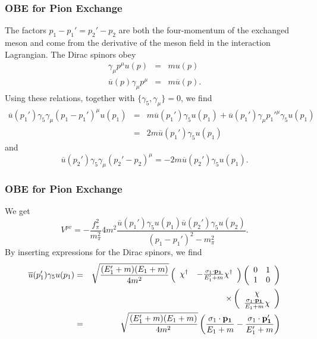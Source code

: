 \documentclass[compress]{beamer}
\begin{document}
\frame
{
\frametitle{OBE for Pion Exchange}
The factors $p_{1}-p_{1}'=p_{2}'-p_{2}$ are both the four-momentum of the 
exchanged meson and come from the derivative of the meson field in 
the interaction Lagrangian. 
The Dirac spinors obey 
\begin{eqnarray}
\gamma_{\mu}p^{\mu}u(p)&=&mu(p) \nonumber \\
\overline{u}(p)\gamma_{\mu}p^{\mu}&=&m\overline{u}(p). \nonumber
\end{eqnarray} 
Using these relations, together with $\{\gamma_{5},\gamma_{\mu}\}=0$, 
we find 
\begin{eqnarray}
\overline{u}(p_{1}')\gamma_{5}\gamma_{\mu}(p_{1}-p_{1}')^{\mu}u(p_{1})
&=&m\overline{u}(p_{1}')\gamma_{5}u(p_{1})+\overline{u}(p_{1}')\gamma_{\mu}
p_{1}'^{\mu}\gamma_{5}u(p_{1}) \nonumber \\
 &=&2m\overline{u}(p_{1}')\gamma_{5}u(p_{1}) \nonumber
\end{eqnarray}
and 
\[
\overline{u}(p_{2}')\gamma_{5}\gamma_{\mu}(p_{2}'-p_{2})^{\mu}=
-2m\overline{u}(p_{2}')\gamma_{5}u(p_{1}).
\]

}


\frame
{
\frametitle{OBE for Pion Exchange}
\begin{small}
We get 
\[
V^{pv}=-\frac{f_{\pi}^{2}}{m_{\pi}^{2}}4m^{2}\frac{\overline{u}(p_{1}')
\gamma_{5}u(p_{1})\overline{u}(p_{2}')\gamma_{5}u(p_{2})}{(p_{1}-p_{1}')
^{2}-m_{\pi}^{2}}.
\]
By inserting expressions for the Dirac spinors, we find
\begin{eqnarray*}
\overline{u}(p_{1}')\gamma_{5}u(p_{1})&=&\sqrt{\frac{(E_{1}'+m)(E_{1}+m)}
{4m^{2}}}\left(\begin{array}{cc}\chi^{\dagger}&-\frac{\sigma_{1}\cdot{
\bf p_{1}}}{E_{1}'
+m}\chi^{\dagger}\end{array}\right)\left(\begin{array}{cc}0&1\\1&0\end{array}
\right)\nonumber \\
 &&\times \left(\begin{array}{c}\chi\\ \frac{\sigma_{1}\cdot{\bf p_{1}}}{E_{1}+m}\chi
\end{array}\right) 
\nonumber \\
 &=&\sqrt{\frac{(E_{1}'+m)(E_{1}+m)}{4m^{2}}}\left(\frac{\sigma_{1}\cdot
{\bf p_{1}}}{E_{1}+m}-\frac{\sigma_{1}\cdot{\bf p_{1}'}}{E_{1}'+m}\right) 
\nonumber 
\end{eqnarray*}
\end{small}
}
\end{document}

